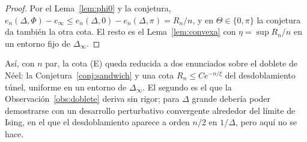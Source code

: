\documentclass[11pt,a4paper]{article}
\theoremstyle{remark}
\begin{document}
\begin{proof}
Por el Lema~\ref{lem:phi0} y la conjetura,
$e_n(\Delta,\Phi)-e_\infty\le e_n(\Delta,0)-e_n(\Delta,\pi)=R_n/n$, y en $\Theta\in\{0,\pi\}$ la
conjetura da también la otra cota. El resto es el Lema~\ref{lem:convexa} con $\eta=\sup R_n/n$ en un
entorno fijo de $\Delta_\infty$.
\end{proof}

Así, con $n$ par, la cota (E) queda reducida a dos enunciados sobre el doblete de Néel: la
Conjetura~\ref{conj:sandwich} y una cota $R_n\le Ce^{-n/\xi}$ del desdoblamiento túnel, uniforme en
un entorno de $\Delta_\infty$. El segundo es el que la Observación~\ref{obs:doblete} deriva sin rigor;
para $\Delta$ grande debería poder demostrarse con un desarrollo perturbativo convergente alrededor del
límite de Ising, en el que el desdoblamiento aparece a orden $n/2$ en $1/\Delta$, pero aquí no se hace.
\end{document}
